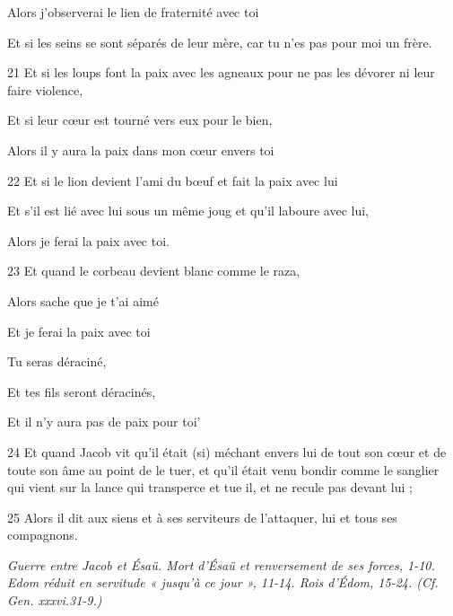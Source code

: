 \par     Alors j'observerai le lien de fraternité avec toi  
\par     Et si les seins se sont séparés de leur mère, car tu n'es pas pour moi un frère.  
\par    
\par 21 Et si les loups font la paix avec les agneaux pour ne pas les dévorer ni leur faire violence,  
\par     Et si leur cœur est tourné vers eux pour le bien,  
\par     Alors il y aura la paix dans mon cœur envers toi
\par    
\par 22 Et si le lion devient l'ami du bœuf et fait la paix avec lui  
\par     Et s’il est lié avec lui sous un même joug et qu’il laboure avec lui,  
\par     Alors je ferai la paix avec toi.  
\par    
\par 23 Et quand le corbeau devient blanc comme le raza,  
\par     Alors sache que je t'ai aimé  
\par     Et je ferai la paix avec toi  
\par     Tu seras déraciné,  
\par     Et tes fils seront déracinés,  
\par     Et il n'y aura pas de paix pour toi'
\par    
\par 24 Et quand Jacob vit qu'il était (si) méchant envers lui de tout son cœur et de toute son âme au point de le tuer, et qu'il était venu bondir comme le sanglier qui vient sur la lance qui transperce et tue il, et ne recule pas devant lui ;
\par 25 Alors il dit aux siens et à ses serviteurs de l'attaquer, lui et tous ses compagnons.


\par \textit{Guerre entre Jacob et Ésaü. Mort d'Ésaü et renversement de ses forces, 1-10. Edom réduit en servitude « jusqu'à ce jour », 11-14. Rois d'Édom, 15-24. (Cf. Gen. xxxvi.31-9.)}

